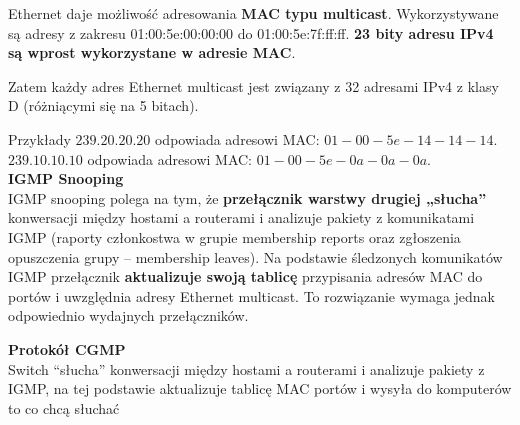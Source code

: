 \documentclass[../main.tex]{subfiles}
\begin{document}
    Ethernet daje możliwość adresowania \textbf{MAC typu multicast}. Wykorzystywane są adresy z
    zakresu 01:00:5e:00:00:00 do 01:00:5e:7f:ff:ff. \textbf{23 bity adresu IPv4 są wprost wykorzystane w
    adresie MAC}.

    Zatem każdy adres Ethernet multicast jest związany z 32 adresami IPv4 z klasy D (różniącymi
    się na 5 bitach).

    Przykłady
    $239.20.20.20$ odpowiada adresowi MAC: $01-00-5e-14-14-14$.\\
    $239.10.10.10$ odpowiada adresowi MAC: $01-00-5e-0a-0a-0a$.\\


    \textbf{IGMP Snooping}\\
    IGMP snooping polega na tym, że \textbf{przełącznik warstwy drugiej „słucha”} konwersacji między
    hostami a routerami i analizuje pakiety z komunikatami IGMP (raporty członkostwa w grupie
    membership reports oraz zgłoszenia opuszczenia grupy – membership leaves). Na podstawie
    śledzonych komunikatów IGMP przełącznik \textbf{aktualizuje swoją tablicę} przypisania adresów
    MAC do portów i uwzględnia adresy Ethernet
    multicast.
    To rozwiązanie wymaga jednak odpowiednio wydajnych przełączników.

    \textbf{Protokół CGMP}\\
    Switch “słucha” konwersacji między hostami a routerami i analizuje pakiety z IGMP, na tej podstawie aktualizuje tablicę MAC portów i wysyła do komputerów to co chcą słuchać
\end{document}
